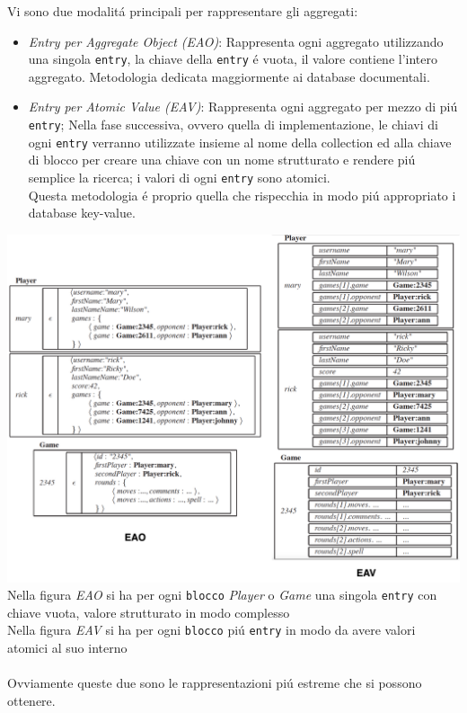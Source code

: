 Vi sono due modalitá principali per rappresentare gli aggregati:
\begin{itemize}
    \item \emph{Entry per Aggregate Object (EAO)}: Rappresenta ogni aggregato utilizzando una singola
    \texttt{entry}, la chiave della \texttt{entry} é vuota, il valore contiene l'intero aggregato.
    Metodologia dedicata maggiormente ai database documentali.
    \item \emph{Entry per Atomic Value (EAV)}: Rappresenta ogni aggregato per mezzo di piú \texttt{entry};
    Nella fase successiva, ovvero quella di implementazione, le chiavi di ogni \texttt{entry} verranno utilizzate
    insieme al nome della collection ed alla chiave di blocco per creare una chiave con un
    nome strutturato e rendere piú semplice la ricerca;
    i valori di ogni \texttt{entry} sono atomici.\\
    Questa metodologia é proprio quella che rispecchia in modo piú appropriato i database key-value.
\end{itemize}
\vspace{0.5cm}
    \includegraphics[width=1\textwidth]{img/eao.eav}
Nella figura \emph{EAO} si ha per ogni \texttt{blocco} \emph{Player} o \emph{Game} una singola \texttt{entry} con chiave vuota,
valore strutturato in modo complesso
\\
Nella figura \emph{EAV} si ha per ogni \texttt{blocco} piú \texttt{entry} in modo da avere valori atomici al suo interno
\\
\\
Ovviamente queste due sono le rappresentazioni piú estreme che si possono ottenere.
